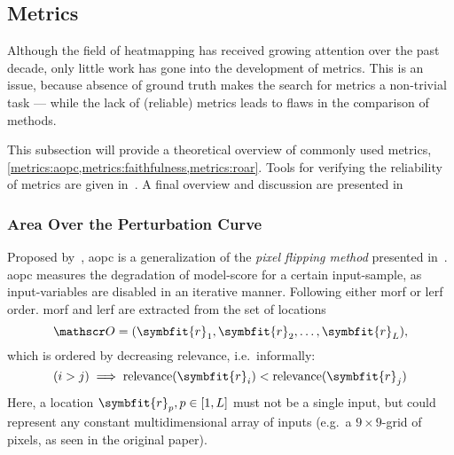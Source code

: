 \subsection{Metrics}
Although the field of heatmapping has received growing attention over the past decade, only little work has gone into the development of metrics. This is an issue, because absence of ground truth makes the search for metrics a non-trivial task --- while the lack of (reliable) metrics leads to flaws in the comparison of methods.

This subsection will provide a theoretical overview of commonly used metrics, \cref{metrics:aopc,metrics:faithfulness,metrics:roar}. Tools for verifying the reliability of metrics are given in~. A final overview and discussion are presented in~

\subsubsection{Area Over the Perturbation Curve}\label{metrics:aopc} Proposed by~, \gls{aopc} is a generalization of the \textit{pixel flipping method} presented in~\cite[34\psqq]{Bach.2015}. \gls{aopc} measures the degradation of model-score for a certain input-sample, as input-variables are disabled in an iterative manner. Following either \gls{morf} or \gls{lerf} order. \gls{morf} and \gls{lerf} are extracted from the set of locations \[ \mathscr O = (\symbfit{r}_1, \symbfit{r}_2, \dots, \symbfit{r}_L), \]  which is ordered by decreasing relevance, i.e.\ informally: \[(i > j) \implies \text{relevance}(\symbfit{r}_i) < \text{relevance}(\symbfit{r}_j) \] Here, a location \( \symbfit{r}_p, p \in [1, L] \) must not be a single input, but could represent any constant multidimensional array of inputs (e.g.\ a \( 9\times9 \)-grid of pixels, as seen in the original paper).

